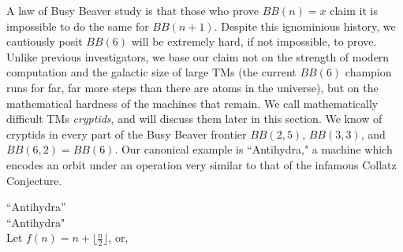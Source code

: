 
A law of Busy Beaver study is that those who prove $BB(n) = x$ claim it is impossible to do the same for $BB(n+1)$. Despite this ignominious history, we cautiously posit $BB(6)$ will be extremely hard, if not impossible, to prove. Unlike previous investigators, we base our claim not on the strength of modern computation and the galactic size of large TMs (the current $BB(6)$ champion runs for far, far more steps than there are atoms in the universe), but on the mathematical hardness of the machines that remain.
We call mathematically difficult TMs \textit{cryptids}, and will discuss them later in this section. We know of cryptids in every part of the Busy Beaver frontier $BB(2,5)$, $BB(3,3)$, and $BB(6,2) = BB(6)$. Our canonical example is ``Antihydra," a machine which encodes an orbit under an operation very similar to that of the infamous Collatz Conjecture.

\begin{example}
    ``Antihydra'' \\
    ``Antihydra"  \\
    Let $f(n) = n + \lfloor \frac{n}{2} \rfloor$, or, 
\end{example}

